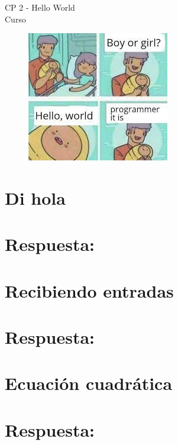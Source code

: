\begin{center}

\begin{large}
CP 2 - Hello World\\
Curso \academicyear\\
\end{large}
\end{center}

\begin{figure}[h]
	\centering
	\includegraphics[width=0.4\linewidth]{cp2/hello_world.jpg}
\end{figure}

\section{Di hola}

\ifshowanswers
\section*{Respuesta:}

\fi

\section{Recibiendo entradas}

\ifshowanswers
\section*{Respuesta:}

\fi

\section{Ecuación cuadrática}

\ifshowanswers
\section*{Respuesta:}

\fi

